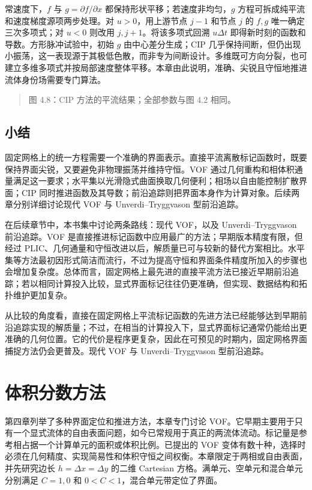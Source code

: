 \documentclass[11pt,a4paper,openany,fontset=none]{ctexbook}
\begin{document}
常速度下，$f$ 与 $g=\partial f/\partial x$ 都保持形状平移；若速度非均匀，$g$ 方程可拆成纯平流和速度梯度源项两步处理。对 $u>0$，用上游节点 $j-1$ 和节点 $j$ 的 $f,g$ 唯一确定三次多项式；对 $u<0$ 则改用 $j,j+1$。将该多项式回溯 $u\Delta t$ 即得新时刻的函数和导数。方形脉冲试验中，初始 $g$ 由中心差分生成；CIP 几乎保持间断，但仍出现小振荡，这一表现源于其极低色散，而非专为间断设计。多维既可方向分裂，也可建立多维多项式并按局部速度整体平移。本章由此说明，准确、尖锐且守恒地推进流体身份场需要专门算法。

\begin{quote}\small 图 4.8：CIP 方法的平流结果；全部参数与图 4.2 相同。\end{quote}
\section{小结}

固定网格上的统一方程需要一个准确的界面表示。直接平流离散标记函数时，既要保持界面尖锐，又要避免非物理振荡并维持守恒。VOF 通过几何重构和相体积通量满足这一要求；水平集以光滑隐式曲面换取几何便利；相场以自由能控制扩散界面；CIP 同时推进函数及其导数；前沿追踪则把界面本身作为计算对象。后续两章分别详细讨论现代 VOF 与 Unverdi--Tryggvason 型前沿追踪。

在后续章节中，本书集中讨论两条路线：现代 VOF，以及 Unverdi--Tryggvason 前沿追踪。VOF 是直接推进标记函数中应用最广的方法；早期版本精度有限，但经过 PLIC、几何通量和守恒改进以后，解质量已可与较新的替代方案相比。水平集等方法最初因形式简洁而流行，不过为提高守恒和界面条件精度所加入的步骤也会增加复杂度。总体而言，固定网格上最先进的直接平流方法已接近早期前沿追踪；若以相同计算投入比较，显式界面标记往往仍更准确，但实现、数据结构和拓扑维护更加复杂。

从比较的角度看，直接在固定网格上平流标记函数的先进方法已经能够达到早期前沿追踪实现的解质量；不过，在相当的计算投入下，显式界面标记通常仍能给出更准确的几何位置。它的代价是程序更复杂，因此在可预见的时期内，固定网格界面捕捉方法仍会更普及。现代 VOF 与 Unverdi--Tryggvason 型前沿追踪。

\chapter{体积分数方法}

第四章列举了多种界面定位和推进方法，本章专门讨论 VOF。它早期主要用于只有一个显式流体的自由表面问题，如今已常规用于真正的两流体流动。标记量是参考相占据一个计算单元的面积或体积比例。已提出的 VOF 变体有数十种，选择时必须在几何精度、实现简易性和体积守恒之间权衡。本章限定于两相或自由表面，并先研究边长 $h=\Delta x=\Delta y$ 的二维 Cartesian 方格。满单元、空单元和混合单元分别满足 $C=1,0$ 和 $0<C<1$，混合单元带定位了界面。
\end{document}
